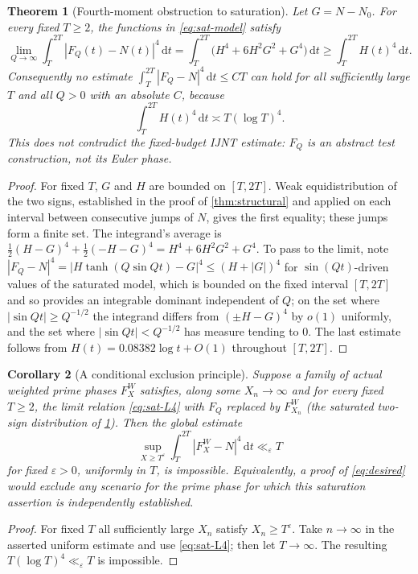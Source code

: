 \documentclass[11pt,a4paper]{article}
\numberwithin{equation}{section}
\newtheorem{theorem}{Theorem}[section]
\newtheorem{corollary}[theorem]{Corollary}
\theoremstyle{definition}
\theoremstyle{remark}
\newcommand{\dd}{\,\mathrm dt}
\begin{document}
\begin{theorem}[Fourth-moment obstruction to saturation]\label{thm:sat-fourth}
Let $G=N-N_0$. For every fixed $T\ge2$, the functions in \eqref{eq:sat-model} satisfy
\begin{equation}\label{eq:sat-L4}
\lim_{Q\to\infty}\int_T^{2T}|F_Q(t)-N(t)|^4\dd
=\int_T^{2T}\bigl(H^4+6H^2G^2+G^4\bigr)\dd
\ge\int_T^{2T}H(t)^4\dd.
\end{equation}
Consequently no estimate $\int_T^{2T}|F_Q-N|^4\dd\le CT$ can hold for all sufficiently large $T$ and all $Q>0$ with an absolute $C$, because
\begin{equation}\label{eq:sat-scale}
\int_T^{2T}H(t)^4\dd\asymp T(\log T)^4.
\end{equation}
This does not contradict the fixed-budget IJNT estimate: $F_Q$ is an abstract test construction, not its Euler phase.
\end{theorem}
\begin{proof}
For fixed $T$, $G$ and $H$ are bounded on $[T,2T]$. Weak equidistribution of the two signs, established in the proof of \cref{thm:structural} and applied on each interval between consecutive jumps of $N$, gives the first equality; these jumps form a finite set. The integrand's average is
$\frac12(H-G)^4+\frac12(-H-G)^4=H^4+6H^2G^2+G^4$.
To pass to the limit, note $|F_Q-N|^4=|H\tanh(Q\sin Qt)-G|^4\le(H+|G|)^4$ for $\sin(Qt)$-driven values of the saturated model, which is bounded on the fixed interval $[T,2T]$ and so provides an integrable dominant independent of $Q$; on the set where $|\sin Qt|\ge Q^{-1/2}$ the integrand differs from $(\pm H-G)^4$ by $o(1)$ uniformly, and the set where $|\sin Qt|<Q^{-1/2}$ has measure tending to $0$. The last estimate follows from $H(t)=0.08382\log t+O(1)$ throughout $[T,2T]$.
\end{proof}

\begin{corollary}[A conditional exclusion principle]\label{cor:exclusion}
Suppose a family of \emph{actual} weighted prime phases $F_X^W$ satisfies, along some $X_n\to\infty$ and for every fixed $T\ge2$, the limit relation \eqref{eq:sat-L4} with $F_Q$ replaced by $F_{X_n}^W$ (the saturated two-sign distribution of \cref{thm:sat-fourth}). Then the global estimate
\begin{equation}\label{eq:desired}
\sup_{X\ge T^\varepsilon}\int_T^{2T}|F_X^W-N|^4\dd\ll_\varepsilon T
\end{equation}
for fixed $\varepsilon>0$, uniformly in $T$, is impossible. Equivalently, a proof of \eqref{eq:desired} would exclude any scenario for the prime phase for which this saturation assertion is \emph{independently established}.
\end{corollary}
\begin{proof}
For fixed $T$ all sufficiently large $X_n$ satisfy $X_n\ge T^\varepsilon$. Take $n\to\infty$ in the asserted uniform estimate and use \eqref{eq:sat-L4}; then let $T\to\infty$. The resulting $T(\log T)^4\ll_\varepsilon T$ is impossible.
\end{proof}
\end{document}
